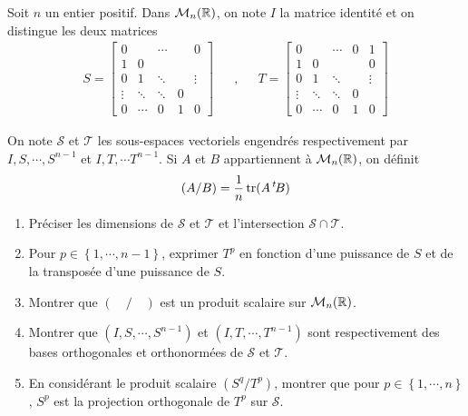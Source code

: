 Soit $n$ un entier positif. Dans $\mathcal{M}_n(\mathbb{R})$, on note $I$ la matrice identité et on distingue les deux matrices 
\begin{align*}
S=
\begin{bmatrix}
0 &  & \cdots &  & 0 \\ 
1 & 0 &  &  &  \\ 
0 & 1 & \ddots &  & \vdots \\ 
\vdots & \ddots & \ddots & 0 &  \\ 
0 & \cdots & 0 & 1 & 0
\end{bmatrix}
& & , & &
T= 
\begin{bmatrix}
0 &  & \cdots & 0 & 1 \\ 
1 & 0 &  &  & 0 \\ 
0 & 1 & \ddots &  & \vdots \\ 
\vdots & \ddots & \ddots & 0 &  \\ 
0 & \cdots & 0 & 1 & 0
\end{bmatrix}
\end{align*}

On note $\mathcal{S}$ et $\mathcal{T}$ les sous-espaces vectoriels engendr\'{e}s respectivement par $I,S,\cdots ,S^{n-1}$ et $I,T,\cdots T^{n-1} $.\newline
Si $A$ et $B$ appartiennent \`{a} $\mathcal{M}_n(\mathbb{R})$, on d\'{e}finit 
\[
(A/B)=\frac 1n\operatorname{tr}(A\,^{t\!}B) 
\]


\begin{enumerate}
\item  Pr\'{e}ciser les dimensions de $\mathcal{S}$ et $\mathcal{T}$ et l'intersection $\mathcal{S}\cap \mathcal{T}$.

\item Pour $p\in \left\{ 1,\cdots ,n-1\right\} $, exprimer $T^p$ en fonction d'une puissance de $S$ et de la transposée d'une puissance de $S$.

\item  Montrer que $(\quad /\quad )$ est un produit scalaire sur $\mathcal{M}_{n}(\mathbb{R})$.

\item  Montrer que $(I,S,\cdots ,S^{n-1})$ et $(I,T,\cdots ,T^{n-1})$ sont respectivement des bases orthogonales et orthonorm\'{e}es de $\mathcal{S}$ et $\mathcal{T}$.

\item  En consid\'{e}rant le produit scalaire $(S^{q}/T^{p})$, montrer que pour $p\in \left\{ 1,\cdots ,n\right\}$, $S^{p}$ est la projection orthogonale de $T^{p}$ sur $\mathcal{S}$.
\end{enumerate}
